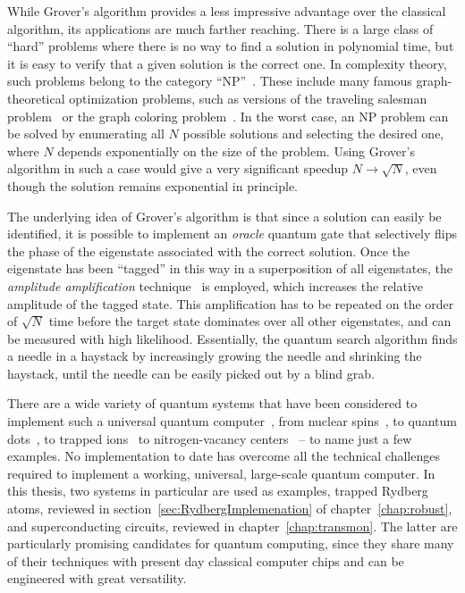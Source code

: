 While Grover's algorithm provides a less impressive advantage over the classical
algorithm, its applications are much farther reaching. There is a large class of
``hard'' problems where there is no way to find a solution in polynomial time,
but it is easy to verify that a given solution is the correct one.
In complexity theory, such problems belong to the category
``NP''~\cite{AroraBook}. These include many famous graph-theoretical
optimization problems, such as versions of the traveling salesman
problem~\cite{LawlerTSPBook} or the graph coloring
problem~\cite{JensenGraphColorBook}.
In the worst case, an NP problem can be solved by
enumerating all $N$ possible solutions and selecting the desired one, where $N$
depends exponentially on the size of the problem. Using Grover's algorithm in
such a case would give a very significant speedup $N \rightarrow \sqrt{N}$, even
though the solution remains exponential in principle.

The underlying idea of Grover's algorithm is that since a solution can easily be
identified, it is possible to implement an \emph{oracle}
%
quantum gate that selectively flips
the phase of the eigenstate associated with the correct solution. Once the
eigenstate has been ``tagged'' in this way in a superposition of all
eigenstates, the \emph{amplitude amplification}
%
technique~\cite{GroverPRL1998, BrassardISTCS1997} is employed, which increases
the relative amplitude of the tagged
state. This amplification has to be repeated on the order of $\sqrt{N}$ time
before the target state dominates over all other eigenstates, and can be
measured with high likelihood. Essentially, the quantum search algorithm finds
a needle in a haystack by increasingly growing the needle and shrinking the
haystack, until the needle can be easily picked out by a blind grab.

There are a wide variety of quantum systems that have been considered to
implement such a universal quantum computer~\cite{NielsenChuang}, from nuclear
spins~\cite{CoryPD1998}, to quantum dots~\cite{ImamogluPRL1999}, to trapped
ions~\cite{CiracPRL95} to nitrogen-vacancy centers~\cite{NizovtsevOS2005} -- to
name just a few examples. No implementation to date has overcome all the
technical challenges required to implement a working, universal, large-scale
quantum computer.
In this thesis, two systems in particular are used as examples, trapped Rydberg
atoms, reviewed in section~\ref{sec:RydbergImplemenation} of
chapter~\ref{chap:robust}, and superconducting circuits, reviewed in
chapter~\ref{chap:transmon}. The latter are particularly promising candidates
for quantum computing, since they share many of their techniques with
present day classical computer chips and can be engineered with great
versatility.

